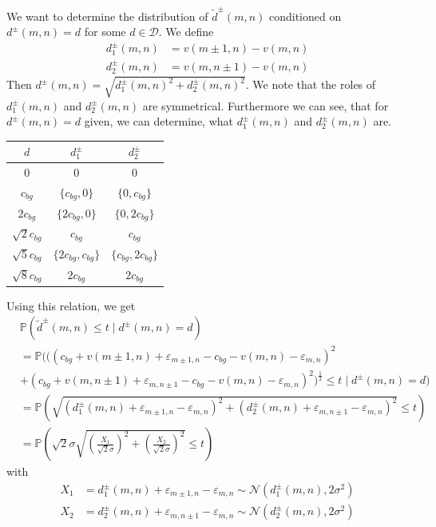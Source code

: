 \documentclass[a4paper,12pt]{article}
\theoremstyle{plain}
\theoremstyle{definition}
\theoremstyle{remark}
\begin{document}
We want to determine the distribution of $\tilde{d}^\pm(m, n)$ conditioned on $d^\pm(m, n) = d$ for some $d \in \mathcal{D}$. We define
\begin{align*}
	d_1^\pm(m, n) &= v(m \pm 1, n) - v(m, n) \\
	d_2^\pm(m, n) &= v(m, n \pm 1) - v(m, n)
\end{align*}
Then $d^\pm(m, n) = \sqrt{d_1^\pm(m, n)^2 + d_2^\pm(m, n)^2}$. We note that the roles of $d_1^\pm(m, n)$ and $d_2^\pm(m, n)$ are symmetrical. Furthermore we can see, that for $d^\pm(m, n) = d$ given, we can determine, what $d_1^\pm(m, n)$ and $d_2^\pm(m, n)$ are.

\begin{center}
	\begin{tabular}{c|c|c}
		$d$ & $d_1^\pm$ & $d_2^\pm$ \\
		\hline
		$0$ & $0$ & $0$ \\
		\hline
		$c_{bg}$ & $\{ c_{bg}, 0 \}$ & $\{ 0, c_{bg} \}$ \\
		\hline
		$2 c_{bg}$ & $\{ 2 c_{bg}, 0 \}$ & $\{ 0, 2 c_{bg} \}$ \\
		\hline
		$\sqrt{2} c_{bg}$ & $c_{bg}$ & $c_{bg}$ \\
		\hline
		$\sqrt{5} c_{bg}$ & $\{ 2 c_{bg}, c_{bg} \}$ & $\{ c_{bg}, 2 c_{bg} \}$ \\
		\hline
		$\sqrt{8} c_{bg}$ & $2 c_{bg}$ & $2 c_{bg}$ \\
	\end{tabular}
\end{center}

Using this relation, we get
\begin{align*}
	&\mathbb{P}(\tilde{d}^\pm(m, n) \leq t \mid d^\pm(m, n) = d) \\
	&= \mathbb{P}(( (c_{bg} + v(m \pm 1, n) + \varepsilon_{m \pm 1, n} - c_{bg} - v(m, n) - \varepsilon_{m, n})^2 \\
	&+ (c_{bg} + v(m, n \pm 1) + \varepsilon_{m, n \pm 1} - c_{bg} - v(m, n) - \varepsilon_{m, n})^2 )^{\frac{1}{2}} \leq t \mid d^\pm(m, n) = d) \\
	&= \mathbb{P}\left( \sqrt{(d_1^\pm(m, n) + \varepsilon_{m \pm 1, n} - \varepsilon_{m, n})^2 + (d_2^\pm(m, n) + \varepsilon_{m, n \pm 1} - \varepsilon_{m, n})^2} \leq t \right) \\
	&= \mathbb{P}\left( \sqrt{2} \sigma \sqrt{\left( \frac{X_1}{\sqrt{2} \sigma} \right)^2 + \left( \frac{X_2}{\sqrt{2} \sigma} \right)^2} \leq t \right)
\end{align*}
with
\begin{align*}
	X_1 &= d_1^\pm(m, n) + \varepsilon_{m \pm 1, n} - \varepsilon_{m, n} \sim \mathcal{N}(d_1^\pm(m, n), 2 \sigma^2) \\
	X_2 &= d_2^\pm(m, n) + \varepsilon_{m, n \pm 1} - \varepsilon_{m, n} \sim \mathcal{N}(d_2^\pm(m, n), 2 \sigma^2)
\end{align*}
\end{document}
